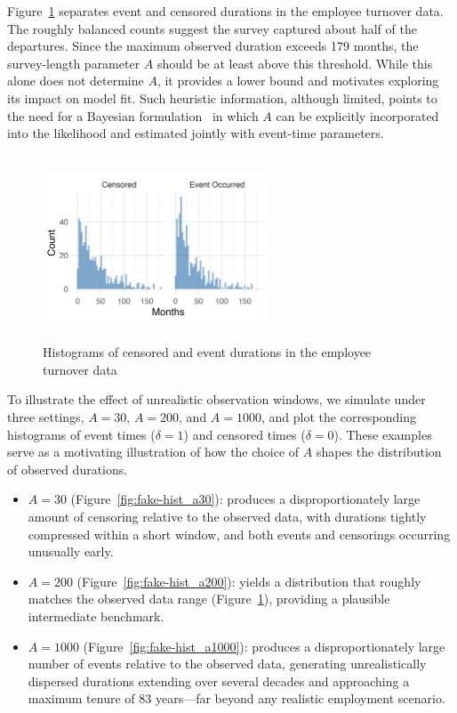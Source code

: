 \begin{example}
Figure~\ref{fig:离职数据分开的直方图} separates event and censored durations in the employee turnover data. The roughly balanced counts suggest the survey captured about half of the departures. Since the maximum observed duration exceeds 179 months, the survey-length parameter $A$ should be at least above this threshold. While this alone does not determine $A$, it provides a lower bound and motivates exploring its impact on model fit. Such heuristic information, although limited, points to the need for a Bayesian formulation~\cite{bartovs2022informed} in which $A$ can be explicitly incorporated into the likelihood and estimated jointly with event-time parameters. 
\begin{figure}[H]
    \centering
    \includegraphics[height=5.5cm, width=0.6\textwidth]{images/separate_hist.png}
    \caption{{\small Histograms of censored and event durations in the employee turnover data}}
    \label{fig:离职数据分开的直方图}
\end{figure}
To illustrate the effect of unrealistic observation windows, we simulate under three settings, $A = 30$, $A = 200$, and $A = 1000$, and plot the corresponding histograms of event times ($\delta = 1$) and censored times ($\delta = 0$). These examples serve as a motivating illustration of how the choice of $A$ shapes the distribution of observed durations.
\begin{itemize}
    \item $A = 30$ (Figure~\ref{fig:fake-hist_a30}): produces a disproportionately large amount of censoring relative to the observed data, with durations tightly compressed within a short window, and both events and censorings occurring unusually early.
    \item $A = 200$ (Figure~\ref{fig:fake-hist_a200}): yields a distribution that roughly matches the observed data range 
    (Figure~\ref{fig:离职数据分开的直方图}), providing a plausible intermediate benchmark.
    \item $A = 1000$ (Figure~\ref{fig:fake-hist_a1000}): produces a disproportionately large number of events relative to the observed data, generating unrealistically dispersed durations extending over several decades and approaching a maximum tenure of 83 years—far beyond any realistic employment scenario.
\end{itemize}


\end{example}
